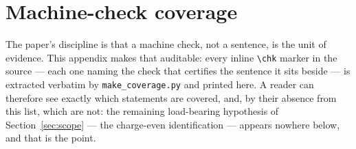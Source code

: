 \documentclass[11pt]{article}
\theoremstyle{plain}
\theoremstyle{definition}
\theoremstyle{remark}
\begin{document}
\section{Machine-check coverage}\label{app:coverage}

The paper's discipline is that a machine check, not a sentence, is the unit
of evidence. This appendix makes that auditable: every inline
\texttt{\textbackslash chk} marker in the source --- each one naming the
check that certifies the sentence it sits beside --- is extracted verbatim
by \texttt{make\_coverage.py} and printed here. A reader can therefore see
exactly which statements are covered, and, by their absence from this list,
which are not: the remaining load-bearing hypothesis of
Section~\ref{sec:scope} --- the charge-even identification --- appears
nowhere below, and that is the point.


\end{document}
